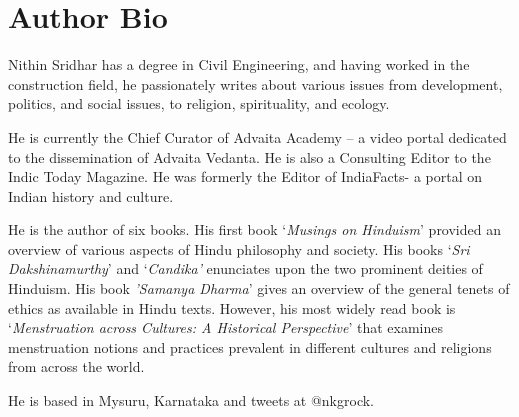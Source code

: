 \chapter{\textbf{Author Bio}}

Nithin Sridhar has a degree in Civil Engineering, and having worked in the construction field, he passionately writes about various issues from development, politics, and social issues, to religion, spirituality, and ecology.

He is currently the Chief Curator of Advaita Academy -- a video portal dedicated to the dissemination of Advaita Vedanta. He is also a Consulting Editor to the Indic Today Magazine. He was formerly the Editor of IndiaFacts- a portal on Indian history and culture.

He is the author of six books. His first book `\emph{Musings on Hinduism}' provided an overview of various aspects of Hindu philosophy and society. His books `\emph{Sri Dakshinamurthy}' and `\emph{Candika'} enunciates upon the two prominent deities of Hinduism. His book \emph{'Samanya Dharma}' gives an overview of the general tenets of ethics as available in Hindu texts. However, his most widely read book is `\emph{Menstruation across Cultures: A Historical Perspective}' that examines menstruation notions and practices prevalent in different cultures and religions from across the world.

He is based in Mysuru, Karnataka and tweets at @nkgrock.

